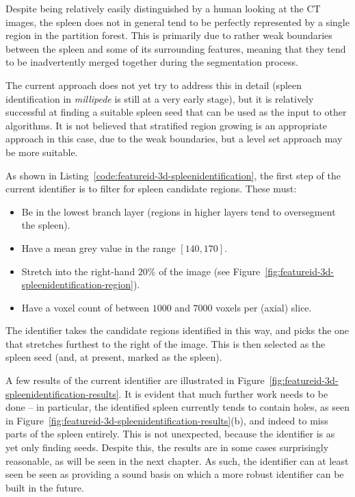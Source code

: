 \noindent Despite being relatively easily distinguished by a human looking at the CT images, the spleen does not in general tend to be perfectly represented by a single region in the partition forest. This is primarily due to rather weak boundaries between the spleen and some of its surrounding features, meaning that they tend to be inadvertently merged together during the segmentation process.

The current approach does not yet try to address this in detail (spleen identification in \emph{millipede} is still at a very early stage), but it is relatively successful at finding a suitable spleen seed that can be used as the input to other algorithms. It is not believed that stratified region growing is an appropriate approach in this case, due to the weak boundaries, but a level set approach may be more suitable.

As shown in Listing~\ref{code:featureid-3d-spleenidentification}, the first step of the current identifier is to filter for spleen candidate regions. These must:
%
\begin{itemize}
\item Be in the lowest branch layer (regions in higher layers tend to oversegment the spleen).
\item Have a mean grey value in the range $[140,170]$.
\item Stretch into the right-hand $20\%$ of the image (see Figure~\ref{fig:featureid-3d-spleenidentification-region}).
\item Have a voxel count of between $1000$ and $7000$ voxels per (axial) slice.
\end{itemize}
%
The identifier takes the candidate regions identified in this way, and picks the one that stretches furthest to the right of the image. This is then selected as the spleen seed (and, at present, marked as the spleen).

A few results of the current identifier are illustrated in Figure~\ref{fig:featureid-3d-spleenidentification-results}. It is evident that much further work needs to be done -- in particular, the identified spleen currently tends to contain holes, as seen in Figure~\ref{fig:featureid-3d-spleenidentification-results}(b), and indeed to miss parts of the spleen entirely. This is not unexpected, because the identifier is as yet only finding seeds. Despite this, the results are in some cases surprisingly reasonable, as will be seen in the next chapter. As such, the identifier can at least seen be seen as providing a sound basis on which a more robust identifier can be built in the future.

